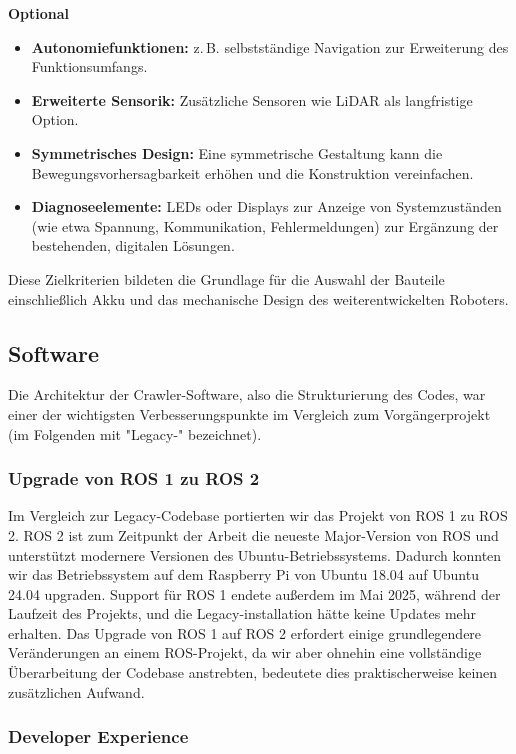 \textbf{Optional}
\begin{itemize}
  \item \textbf{Autonomiefunktionen:} z.\,B. selbstständige Navigation zur Erweiterung des Funktionsumfangs.
  \item \textbf{Erweiterte Sensorik:} Zusätzliche Sensoren wie LiDAR als langfristige Option.
  \item \textbf{Symmetrisches Design:} Eine symmetrische Gestaltung kann die Bewegungsvorhersagbarkeit erhöhen und die Konstruktion vereinfachen.
  \item \textbf{Diagnoseelemente:} LEDs oder Displays zur Anzeige von Systemzuständen (wie etwa Spannung, Kommunikation, Fehlermeldungen) zur Ergänzung der bestehenden, digitalen Lösungen.
\end{itemize}

Diese Zielkriterien bildeten die Grundlage für die Auswahl der Bauteile einschließlich Akku und das mechanische Design des weiterentwickelten Roboters.

\subsection{Software}

Die Architektur der Crawler-Software, also die Strukturierung des Codes, war einer der wichtigsten Verbesserungspunkte im Vergleich zum Vorgängerprojekt (im Folgenden mit "Legacy-" bezeichnet). 

\subsubsection{Upgrade von ROS 1 zu ROS 2}

Im Vergleich zur Legacy-Codebase portierten wir das Projekt von ROS 1 zu ROS 2. ROS 2 ist zum Zeitpunkt der Arbeit die neueste Major-Version von ROS und unterstützt modernere Versionen des Ubuntu-Betriebssystems. Dadurch konnten wir das Betriebssystem auf dem Raspberry Pi von Ubuntu 18.04 auf Ubuntu 24.04 upgraden. Support für ROS 1 endete außerdem im Mai 2025, während der Laufzeit des Projekts, und die Legacy-installation hätte keine Updates mehr erhalten. Das Upgrade von ROS 1 auf ROS 2 erfordert einige grundlegendere Veränderungen an einem ROS-Projekt, da wir aber ohnehin eine vollständige Überarbeitung der Codebase anstrebten, bedeutete dies praktischerweise keinen zusätzlichen Aufwand. 

\subsubsection{Developer Experience}

